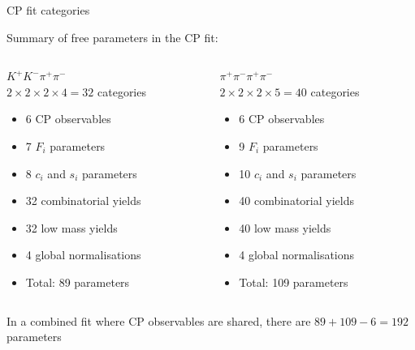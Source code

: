 \documentclass[xcolor={dvipsnames}]{beamer}
\begin{document}
\begin{frame}{CP fit categories}
  \begin{center}
    {\large Summary of free parameters in the CP fit:}
  \end{center}
  \vspace{-0.5cm}
  \begin{columns}
    \begin{column}{0.5\textwidth}
      \begin{center}
        $K^+K^-\pi^+\pi^-$ \\
        $2\times2\times2\times4 = 32$ categories
      \end{center}
      \begin{itemize}
        \setlength\itemsep{0.0em}
        \item{6 CP observables}
        \item{7 $F_i$ parameters}
        \item{8 $c_i$ and $s_i$ parameters}
        \item{32 combinatorial yields}
        \item{32 low mass yields}
        \item{4 global normalisations}
        \item{Total: 89 parameters}
      \end{itemize}
    \end{column}
    \begin{column}{0.5\textwidth}
      \begin{center}
        $\pi^+\pi^-\pi^+\pi^-$ \\
        $2\times2\times2\times5 = 40$ categories
      \end{center}
      \begin{itemize}
        \setlength\itemsep{0.0em}
        \item{6 CP observables}
        \item{9 $F_i$ parameters}
        \item{10 $c_i$ and $s_i$ parameters}
        \item{40 combinatorial yields}
        \item{40 low mass yields}
        \item{4 global normalisations}
        \item{Total: 109 parameters}
      \end{itemize}
    \end{column}
  \end{columns}
  \vspace{0.3cm}
  \begin{center}
    In a combined fit where CP observables are shared, there are $89 + 109 - 6 = 192$ parameters
  \end{center}
\end{frame}
\end{document}
